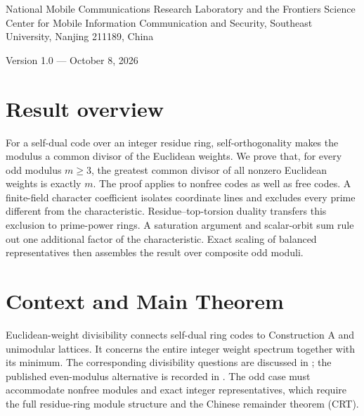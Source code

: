 \documentclass[12pt,letterpaper,onecolumn]{article}
\begin{document}
\par\medskip
{}\medskip
{}\par\smallskip
\noindent\begin{minipage}{\linewidth}\small National Mobile Communications Research Laboratory and the Frontiers Science Center for Mobile Information Communication and Security, Southeast University, Nanjing 211189, China\end{minipage}\par\medskip
\noindent Version 1.0 --- October 8, 2026\par\bigskip
{}
\section*{Result overview}
For a self-dual code over an integer residue ring, self-orthogonality makes the modulus a common divisor of the Euclidean weights. We prove that, for every odd modulus $m\ge3$, the greatest common divisor of all nonzero Euclidean weights is exactly $m$. The proof applies to nonfree codes as well as free codes. A finite-field character coefficient isolates coordinate lines and excludes every prime different from the characteristic. Residue--top-torsion duality transfers this exclusion to prime-power rings. A saturation argument and scalar-orbit sum rule out one additional factor of the characteristic. Exact scaling of balanced representatives then assembles the result over composite odd moduli.
\section{Context and Main Theorem}
Euclidean-weight divisibility connects self-dual ring codes to Construction A and unimodular lattices. It concerns the entire integer weight spectrum together with its minimum. The corresponding divisibility questions are discussed in \cite{JoynerKim2011}; the published even-modulus alternative is recorded in \cite{BannaiDoughertyHaradaOura1999}. The odd case must accommodate nonfree modules and exact integer representatives, which require the full residue-ring module structure and the Chinese remainder theorem (CRT).
\end{document}
